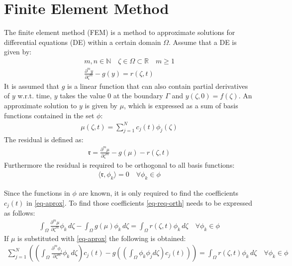 \section{Finite Element Method}
The finite element method (FEM) is a method to approximate solutions for differential equations (DE) within a certain domain \(\Omega\).
Assume that a DE is given by:
\begin{gather}
m, n \in \mathbb{N} \quad \zeta \in \Omega \subset \mathbb{R} \quad m \geq 1 \\
\frac{\partial^{m} y}{\partial \zeta^{m}} -  g(y) = r(\zeta, t) \label{eq-pde-gen} 
\end{gather}
It is assumed that \(g\) is a linear function that can also contain partial derivatives of \(y\) w.r.t. time, \(y\) takes the value 0 at the boundary \(\Gamma\) and \(y(\zeta, 0) = f(\zeta)\).
An approximate solution to \(y\) is given by \(\mu\), which is expressed as a sum of basis functions contained in the set \(\phi\):
\begin{gather}
\mu(\zeta, t) = \sum_{j = 1}^{N} c_{j}(t)\phi_{j}(\zeta) \label{eq-aprox}
\end{gather}
The residual is defined as:
\begin{gather}
\mathfrak{r} = \frac{\partial^{m} \mu}{\partial \zeta^{m}} -  g(\mu) - r(\zeta, t) 
\end{gather}
Furthermore the residual is required to be orthogonal to all basis functions:
\begin{gather}
\langle \mathfrak{r}, \phi_{k} \rangle = 0 \quad \forall \phi_{k} \in \phi \label{eq-req-orth}
\end{gather}

Since the functions in \(\phi\) are known, it is only required to find the coefficients \(c_{j}(t)\) in \ref{eq-aprox}.
To find those coefficients \ref{eq-req-orth} needs to be expressed as follows:
\begin{gather}
\int_{\Omega} \frac{\partial^{m} \mu}{\partial \zeta^{m}} \phi_{k} \, d\zeta  -  \int_{\Omega} g(\mu) \phi_{k}        \, d\zeta = \int_{\Omega}  r(\zeta, t) \phi_{k}        \, d\zeta \quad \forall \phi_{k} \in \phi 
\end{gather}
If \(\mu\) is substituted with \ref{eq-aprox} the following is obtained:
\begin{gather}
\sum_{j = 1}^{N} ((\int_{\Omega} \frac{\partial^{m} \phi_{j}}{\partial \zeta^{m}} \phi_{k} \, d\zeta) c_{j}(t) - g((\int_{\Omega} \phi_k \phi_j d\zeta) c_{j}(t)))  = \int_{\Omega}  r(\zeta, t) \phi_{k}        \, d\zeta \quad \forall \phi_{k} \in \phi \label{eq-al}
\end{gather}

